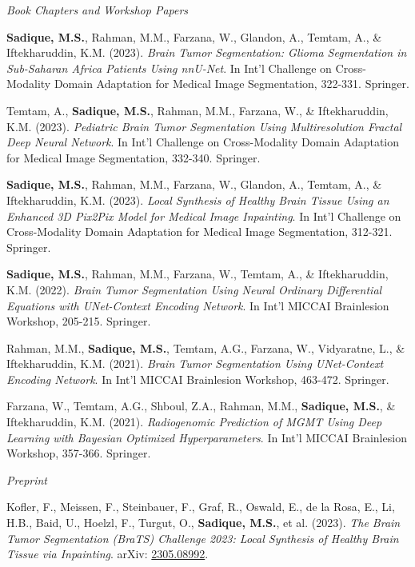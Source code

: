 \documentclass[11pt,letterpaper]{article}
\begin{document}
\vspace{7pt}
\textit{Book Chapters and Workshop Papers}
\begin{enumerate}[label={[B\arabic*]},leftmargin=34pt]
\item \textbf{Sadique, M.S.}, Rahman, M.M., Farzana, W., Glandon, A., Temtam, A., \& Iftekharuddin, K.M. (2023). \textit{Brain Tumor Segmentation: Glioma Segmentation in Sub-Saharan Africa Patients Using nnU-Net}. In Int'l Challenge on Cross-Modality Domain Adaptation for Medical Image Segmentation, 322-331. Springer.
\item Temtam, A., \textbf{Sadique, M.S.}, Rahman, M.M., Farzana, W., \& Iftekharuddin, K.M. (2023). \textit{Pediatric Brain Tumor Segmentation Using Multiresolution Fractal Deep Neural Network}. In Int'l Challenge on Cross-Modality Domain Adaptation for Medical Image Segmentation, 332-340. Springer.
\item \textbf{Sadique, M.S.}, Rahman, M.M., Farzana, W., Glandon, A., Temtam, A., \& Iftekharuddin, K.M. (2023). \textit{Local Synthesis of Healthy Brain Tissue Using an Enhanced 3D Pix2Pix Model for Medical Image Inpainting}. In Int'l Challenge on Cross-Modality Domain Adaptation for Medical Image Segmentation, 312-321. Springer.
\item \textbf{Sadique, M.S.}, Rahman, M.M., Farzana, W., Temtam, A., \& Iftekharuddin, K.M. (2022). \textit{Brain Tumor Segmentation Using Neural Ordinary Differential Equations with UNet-Context Encoding Network}. In Int'l MICCAI Brainlesion Workshop, 205-215. Springer.
\item Rahman, M.M., \textbf{Sadique, M.S.}, Temtam, A.G., Farzana, W., Vidyaratne, L., \& Iftekharuddin, K.M. (2021). \textit{Brain Tumor Segmentation Using UNet-Context Encoding Network}. In Int'l MICCAI Brainlesion Workshop, 463-472. Springer.
\item Farzana, W., Temtam, A.G., Shboul, Z.A., Rahman, M.M., \textbf{Sadique, M.S.}, \& Iftekharuddin, K.M. (2021). \textit{Radiogenomic Prediction of MGMT Using Deep Learning with Bayesian Optimized Hyperparameters}. In Int'l MICCAI Brainlesion Workshop, 357-366. Springer.
\end{enumerate}

\vspace{7pt}
\textit{Preprint}
\begin{enumerate}[label={[P\arabic*]},leftmargin=34pt]
\item Kofler, F., Meissen, F., Steinbauer, F., Graf, R., Oswald, E., de la Rosa, E., Li, H.B., Baid, U., Hoelzl, F., Turgut, O., \textbf{Sadique, M.S.}, et al. (2023). \textit{The Brain Tumor Segmentation (BraTS) Challenge 2023: Local Synthesis of Healthy Brain Tissue via Inpainting}. arXiv: \href{https://arxiv.org/abs/2305.08992}{2305.08992}.
\end{enumerate}
\end{document}
